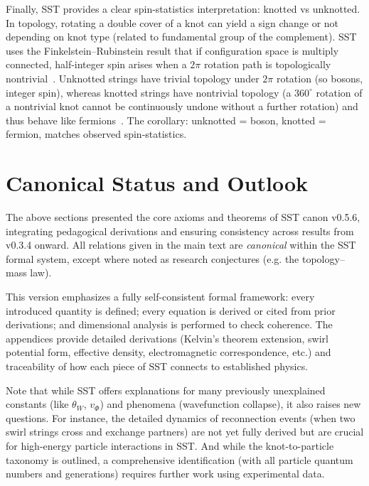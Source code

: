 \documentclass[aps,onecolumn,10pt,nofootinbib]{revtex4}
\begin{document}
	Finally, SST provides a clear spin-statistics interpretation: knotted vs unknotted. In topology, rotating a double cover of a knot can yield a sign change or not depending on knot type (related to fundamental group of the complement). SST uses the Finkelstein–Rubinstein result that if configuration space is multiply connected, half-integer spin arises when a $2\pi$ rotation path is topologically nontrivial~\cite{index111}. Unknotted strings have trivial topology under $2\pi$ rotation (so bosons, integer spin), whereas knotted strings have nontrivial topology (a $360^\circ$ rotation of a nontrivial knot cannot be continuously undone without a further rotation) and thus behave like fermions~\cite{index112}. The corollary: unknotted = boson, knotted = fermion, matches observed spin-statistics.


	\section{Canonical Status and Outlook}
	The above sections presented the core axioms and theorems of SST canon v0.5.6, integrating pedagogical derivations and ensuring consistency across results from v0.3.4 onward. All relations given in the main text are \emph{canonical} within the SST formal system, except where noted as research conjectures (e.g. the topology–mass law).

	This version emphasizes a fully self-consistent formal framework: every introduced quantity is defined; every equation is derived or cited from prior derivations; and dimensional analysis is performed to check coherence. The appendices provide detailed derivations (Kelvin’s theorem extension, swirl potential form, effective density, electromagnetic correspondence, etc.) and traceability of how each piece of SST connects to established physics.

	Note that while SST offers explanations for many previously unexplained constants (like $\theta_W$, $v_{\Phi}$) and phenomena (wavefunction collapse), it also raises new questions. For instance, the detailed dynamics of reconnection events (when two swirl strings cross and exchange partners) are not yet fully derived but are crucial for high-energy particle interactions in SST. And while the knot-to-particle taxonomy is outlined, a comprehensive identification (with all particle quantum numbers and generations) requires further work using experimental data.
\end{document}
